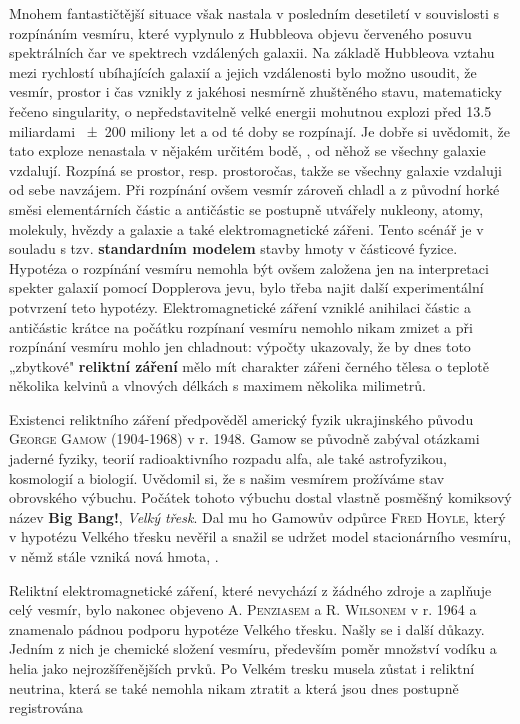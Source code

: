         Mnohem fantastičtější situace však nastala v posledním desetiletí v souvislosti s rozpínáním
        vesmíru, které vyplynulo z Hubbleova objevu červeného posuvu spektrálních čar ve spektrech
        vzdálených galaxii. Na základě Hubbleova vztahu mezi rychlostí ubíhajících galaxií a jejich
        vzdálenosti bylo možno usoudit, že vesmír, prostor i čas vznikly z jakéhosi nesmírně
        zhuštěného stavu, matematicky řečeno singularity, o nepředstavitelně velké energii mohutnou
        explozi před \num{13.5} miliardami \num{+-200} miliony let a od té doby se rozpínají. Je
        dobře si uvědomit, že tato exploze nenastala v nějakém určitém bodě, \emph{}, od něhož se všechny galaxie vzdalují. Rozpíná se prostor, resp. prostoročas,
        takže se všechny galaxie vzdaluji od sebe navzájem. Při rozpínání ovšem vesmír zároveň
        chladl a z původní horké směsi elementárních částic a antičástic se postupně utvářely
        nukleony, atomy, molekuly, hvězdy a galaxie a také elektromagnetické zářeni. Tento scénář je
        v souladu s tzv. \textbf{standardním modelem} stavby hmoty v částicové fyzice. Hypotéza o
        rozpínání vesmíru nemohla být ovšem založena jen na interpretaci spekter galaxií pomocí
        Dopplerova jevu, bylo třeba najit další experimentální potvrzení teto hypotézy.
        Elektromagnetické záření vzniklé anihilaci částic a antičástic krátce na počátku rozpínaní
        vesmíru nemohlo nikam zmizet a při rozpínání vesmíru mohlo jen chladnout: výpočty ukazovaly,
        že by dnes toto „zbytkové" \textbf{reliktní záření} mělo mít charakter zářeni černého tělesa
        o teplotě několika kelvinů a vlnových délkách s maximem několika milimetrů. 

        Existenci reliktního záření předpověděl americký fyzik ukrajinského původu \textsc{George
        Gamow} (1904-1968) v r. 1948. Gamow se původně zabýval otázkami jaderné fyziky, teorií
        radioaktivního rozpadu alfa, ale také astrofyzikou, kosmologií a biologií. Uvědomil si, že s
        našim vesmírem prožíváme stav obrovského výbuchu. Počátek tohoto výbuchu dostal vlastně
        posměšný komiksový název \textbf{Big Bang!}, \emph{Velký třesk}. Dal mu ho Gamowův odpůrce
        \textsc{Fred Hoyle}, který v hypotézu Velkého třesku nevěřil a snažil se udržet model
        stacionárního vesmíru, v němž stále vzniká nová hmota, \emph{}.

        Reliktní elektromagnetické záření, které nevychází z žádného zdroje a zaplňuje celý vesmír,
        bylo nakonec objeveno \textsc{A. Penziasem} a \textsc{R. Wilsonem} v r. 1964 a znamenalo
        pádnou podporu hypotéze Velkého třesku. Našly se i další důkazy. Jedním z nich je chemické
        složení vesmíru, především poměr množství vodíku a helia jako nejrozšířenějších prvků. Po
        Velkém tresku musela zůstat i reliktní neutrina, která se také nemohla nikam ztratit a která
        jsou dnes postupně registrována

